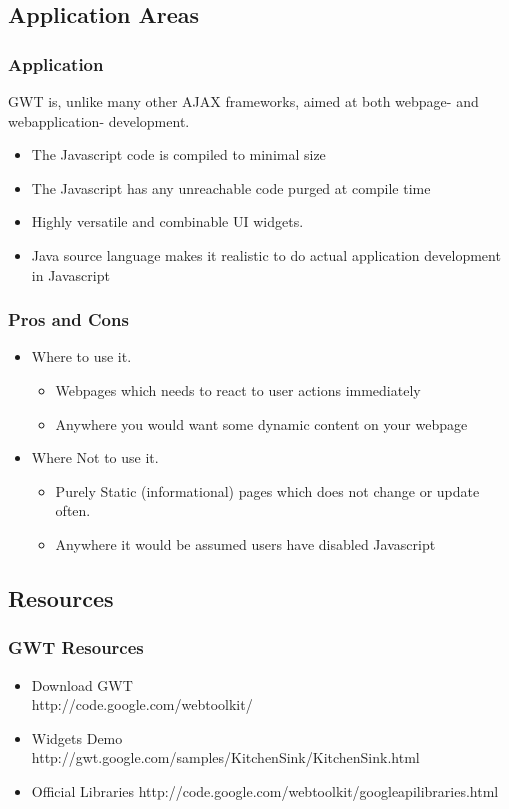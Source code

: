 \subsection{Application Areas} %
\begin{frame}[red] %
\frametitle{Application}

GWT is, unlike many other AJAX frameworks, aimed at both webpage- 
and webapplication- development.

\begin{itemize} 
 	\item The Javascript code is compiled to minimal size
 	\item The Javascript has any unreachable code purged at compile time
	\item Highly versatile and combinable UI widgets.
	\item Java source language makes it realistic to do actual application
	development in Javascript
\end{itemize}

\end{frame}
\begin{frame}[red] %
\frametitle{Pros and Cons}

\begin{itemize} 
	\item Where to use it.
	\begin{itemize} 
	 	\item Webpages which needs to react to user actions immediately
	 	\item Anywhere you would want some dynamic content on your webpage
	\end{itemize}
	\item Where Not to use it.
	\begin{itemize} 
	 	\item Purely Static (informational) pages which does not change or update often.
	 	\item Anywhere it would be assumed users have disabled Javascript
	 \end{itemize}
\end{itemize}

\end{frame}

\subsection{Resources} %
\begin{frame}[red] %
\frametitle{GWT Resources}

\begin{itemize}
\item Download GWT\\ http://code.google.com/webtoolkit/
\item Widgets Demo http://gwt.google.com/samples/KitchenSink/KitchenSink.html
\item Official Libraries http://code.google.com/webtoolkit/googleapilibraries.html
\end{itemize}
\end{frame}